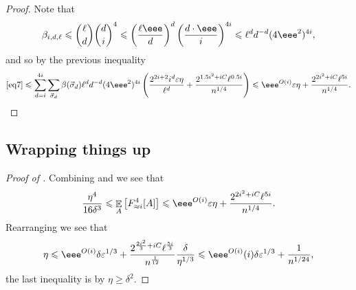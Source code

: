 \documentclass{toc}
\newcommand\Expect[2]{{\mathop{\mathbb{E}}_{#1}\left[ {#2} \right]}}
\newcommand\eps{\varepsilon}
\renewcommand\geq{\geqslant}
\renewcommand\leq{\leqslant}
\newcommand\expp[1]{\eee^{O({#1})}}
\newcommand\approxlvlfn[2]{{#1}_{\approx{#2}}}
\begin{document}
\begin{proof}
Note that
\[
\beta_{i,d,\ell}
\leq {\ell \choose d} {d \choose i}^4
\leq \left(\frac{\ell \eee}{d}\right)^{d}\left(\frac{d\cdot \eee}{i}\right)^{4i}
\leq \ell^d d^{-d} (4\eee^2)^{4i},
\]
and so by the previous inequality
\begin{align*}
\eqref{eq7}
\leq \sum\limits_{d=i}^{4i}{
\sum\limits_{\vec{\sigma}_d}{
\beta(\vec{\sigma}_d)\ell^d d^{-d} (4\eee^2)^{4i} \left(
\frac{2^{2i+2} i^{d} \eps\eta}{\ell^{d}}+\frac{2^{1.5i^2+iC} \ell^{0.5i}}{n^{1/4}}
\right)
}}
\leq \expp{i} \eps\eta + \frac{2^{2i^2+iC} \ell^{5i}}{n^{1/4}}.
\end{align*}
\end{proof}


\subsection{Wrapping things up}
\begin{proof}[Proof of ]
Combining  and  we see that
\[
\frac{\eta^4}{16\delta^3} \leq \Expect{A}{\approxlvlfn{F}{i}^4[A]}
\leq  \expp{i} \eps\eta+ \frac{2^{2i^2+iC} \ell^{5i}}{n^{1/4}}.
\]
Rearranging we see that
\[
\eta
\leq \expp{i} \delta\eps^{1/3} + \frac{2^{\frac{2i^2}{3}+iC} \ell^{\frac{5i}{3}}}{n^{\frac{1}{12}}}\frac{\delta}{\eta^{1/3}}
\leq  \expp{i}(i) \delta\eps^{1/3} + \frac{1}{n^{1/24}},
\]
the last inequality is by $\eta\geq \delta^2$.
\end{proof}
\end{document}
